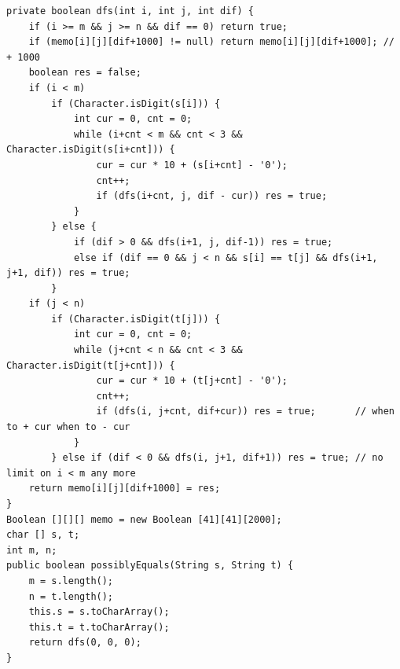 \documentclass[9pt, b5paaper]{book}
\begin{document}
\begin{verbatim}
private boolean dfs(int i, int j, int dif) {
    if (i >= m && j >= n && dif == 0) return true;
    if (memo[i][j][dif+1000] != null) return memo[i][j][dif+1000]; // + 1000
    boolean res = false;
    if (i < m) 
        if (Character.isDigit(s[i])) {
            int cur = 0, cnt = 0;
            while (i+cnt < m && cnt < 3 && Character.isDigit(s[i+cnt])) {
                cur = cur * 10 + (s[i+cnt] - '0');
                cnt++;
                if (dfs(i+cnt, j, dif - cur)) res = true;
            }
        } else {
            if (dif > 0 && dfs(i+1, j, dif-1)) res = true;
            else if (dif == 0 && j < n && s[i] == t[j] && dfs(i+1, j+1, dif)) res = true;
        }
    if (j < n) 
        if (Character.isDigit(t[j])) {
            int cur = 0, cnt = 0;
            while (j+cnt < n && cnt < 3 && Character.isDigit(t[j+cnt])) {
                cur = cur * 10 + (t[j+cnt] - '0');
                cnt++;
                if (dfs(i, j+cnt, dif+cur)) res = true;       // when to + cur when to - cur
            }
        } else if (dif < 0 && dfs(i, j+1, dif+1)) res = true; // no limit on i < m any more
    return memo[i][j][dif+1000] = res;
}
Boolean [][][] memo = new Boolean [41][41][2000];
char [] s, t;
int m, n;
public boolean possiblyEquals(String s, String t) {
    m = s.length();
    n = t.length();
    this.s = s.toCharArray();
    this.t = t.toCharArray();
    return dfs(0, 0, 0);
}
\end{verbatim}
\end{document}
